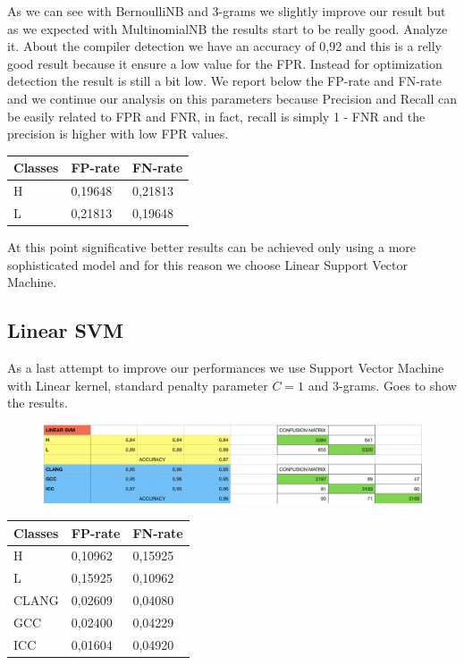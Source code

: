\documentclass[12pt]{article}
\begin{document}
As we can see with BernoulliNB and 3-grams we slightly improve our result but as we expected with MultinomialNB the results start to be really good. Analyze it.
About the compiler detection we have an accuracy of 0,92 and this is a relly good result because it ensure a low value for the FPR. Instead for optimization detection the result is still a bit low. We report below the FP-rate and FN-rate and we continue our analysis on this parameters because Precision and Recall can be easily related to FPR and FNR, in fact, recall is simply 1 - FNR and the precision is higher with low FPR values.

\bigskip
\begin{tabular}{ | l | l | l | }
    \hline
    \textbf{Classes} & \textbf{FP-rate} & \textbf{FN-rate} \\ \hline
    H & 0,19648 & 0,21813 \\ \hline
    L & 0,21813 & 0,19648 \\ \hline
\end{tabular}
\bigskip

At this point significative better results can be achieved only using a more sophisticated model and for this reason we choose Linear Support Vector Machine.

\subsection{Linear SVM}
As a last attempt to improve our performances we use Support Vector Machine with Linear kernel, standard penalty parameter $C = 1$ and 3-grams. Goes to show the results.

\begin{figure}[!ht]
  \includegraphics[width=1\textwidth]{pic6}
  \label{fig: Linear SVM with 3-grams}
\end{figure}

\bigskip
\begin{tabular}{ | l | l | l | }
    \hline
    \textbf{Classes} & \textbf{FP-rate} & \textbf{FN-rate} \\ \hline
    H & 0,10962 & 0,15925 \\ \hline
    L & 0,15925 & 0,10962 \\ \hline
    CLANG & 0,02609 & 0,04080 \\ \hline
    GCC & 0,02400 & 0,04229 \\ \hline
    ICC & 0,01604 & 0,04920 \\ \hline
\end{tabular}
\bigskip
\end{document}
